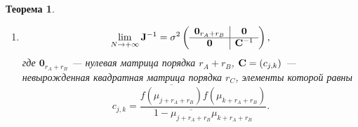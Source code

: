 \documentclass[12pt,a4paper]{article}
\newtheorem{theorem}{Теорема}
\begin{document}
\begin{theorem}
\begin{enumerate}
		Тогда \begin{equation*}
		\lim_{N \to + \infty} \widetilde \bfN^* \Sigma_N^{-1} \widetilde \bfN = \left( \begin{array}{c|c|c}
		\widetilde \bfA & \mathbf{0} & \mathbf{0} \\ \hline
		\mathbf{0} & \mathbf{1}_{r_B} & \mathbf{0} \\ \hline
		\mathbf{0} & \mathbf{0} & \widetilde \bfC
		\end{array}  \right),
		\end{equation*}
		где матрица $\widetilde \bfA = (\tilde a_{j, k})$ --- невырожденная квадратная матрица порядка $r_A$, элементы которой равны
		\begin{equation*}
		\tilde a_{j, k} = \frac{\sqrt{\mu_j \overline{\mu_j} - 1}\sqrt{\mu_k \overline{\mu_k} - 1} }{(\overline{\mu_j} \mu_k - 1)} \frac{\overline{f(1/\mu_j)} f(1/\mu_k) }{|f(1/\mu_j)| |f(1/\mu_k)|},
		\end{equation*}
		$\mathbf{1}_{r_B}$ --- единичная квадратная матрица порядка $r_B$, $\widetilde \bfC = (\tilde c_{j, k})$ --- невырожденная квадратная матрица порядка $r_C$, элементы которой равны
		\begin{multline*}
		\tilde c_{j, k} = \frac{\sqrt{1 - \mu_{j+r_A+r_B} \overline{\mu_{j+r_A+r_B}}}\sqrt{1 - \mu_{k+r_A+r_B} \overline{\mu_{k+r_A+r_B}}}}{1 - \overline{\mu_{j+r_A+r_B}} \mu_{k+r_A+r_B}} \cdot \\ \cdot \frac{\overline{f(\mu_{j+r_A+r_B})} f(\mu_{k+r_A+r_B})}{|f(\mu_{j+r_A+r_B})| |f(\mu_{k+r_A+r_B})|}.
		\end{multline*}
		
		\item 
	    \begin{equation*}
	    \lim_{N \to + \infty} \mathbf{J}^{-1} = \sigma^2 \left( \begin{array}{c|c}
	    \mathbf{0}_{r_A + r_B} & \mathbf{0} \\ \hline
	    \mathbf{0} & \mathbf{C}^{-1}
	    \end{array}  \right),
	    \end{equation*}
	    где $\mathbf{0}_{r_A + r_B}$ --- нулевая матрица порядка $r_A + r_B$, $\mathbf{C} = (c_{j,k})$ --- невырожденная квадратная матрица порядка $r_C$, элементы которой равны
		\begin{equation*}
		c_{j, k} = \frac{\overline{f(\mu_{j + r_A + r_B})} f(\mu_{k + r_A + r_B})}{1 - \overline{\mu_{j+r_A+r_B}} \mu_{k+r_A+r_B}}.
		\end{equation*}
	\end{enumerate}
\end{theorem}
\end{document}
